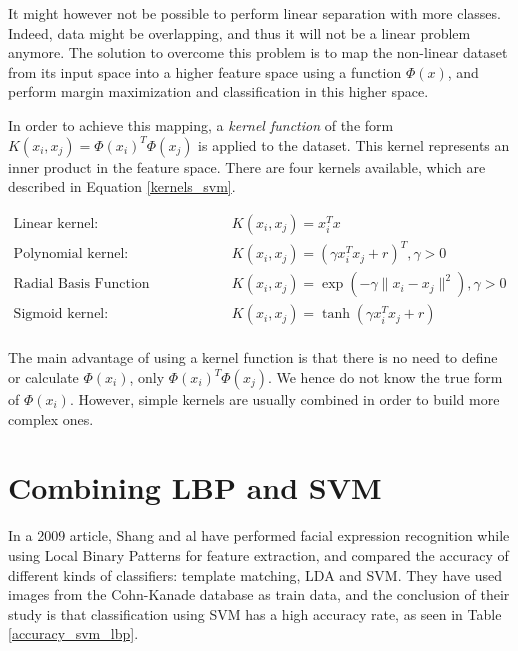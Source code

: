 \vspace{\baselineskip}
\noindent It might however not be possible to perform linear separation with more classes. Indeed, data might be overlapping, and thus it will not be a linear problem anymore. The solution to overcome this problem is to map the non-linear dataset from its input space into a higher feature space using a function $\Phi(x)$, and perform margin maximization and classification in this higher space. 
\newline

\noindent In order to achieve this mapping, a \textit{kernel function} of the form $K(x_i, x_j) = \Phi(x_i)^T \Phi(x_j)$ is applied to the dataset. This kernel represents an inner product in the feature space. There are four kernels available, which are described in Equation \ref{kernels_svm}.
\newline

\begin{equation}
\begin{array}{ll}
	\text{Linear kernel:} & K(x_i,x_j) = x_i^Tx \\
	\text{Polynomial kernel:} & K(x_i,x_j) = (\gamma x_i^Tx_j + r)^T, \gamma > 0 \\
	\text{Radial Basis Function (Gaussian) kernel:} & K(x_i,x_j) = \exp(-\gamma \| x_i - x_j \|^2), \gamma > 0 \\
	\text{Sigmoid kernel:} & K(x_i,x_j) = \tanh(\gamma x_i^T x_j + r)\\
\end{array}
\label{kernels_svm}
\end{equation}

\vspace{\baselineskip}

\noindent The main advantage of using a kernel function is that there is no need to define or calculate $\Phi(x_i)$, only $\Phi(x_i)^T \Phi(x_j)$. We hence do not know the true form of $\Phi(x_i)$. However, simple kernels are usually combined in order to build more complex ones.
\newline

\section{Combining LBP and SVM}

\vspace{\baselineskip}
\noindent In a 2009 article, Shang and al \cite{SHA09} have performed facial expression recognition while using Local Binary Patterns for feature extraction, and compared the accuracy of different kinds of classifiers:  template matching,  LDA and SVM. They have used images from the Cohn-Kanade database as train data, and the conclusion of their study is that classification using SVM has a high accuracy rate, as seen in Table \ref{accuracy_svm_lbp}. 
\newline

